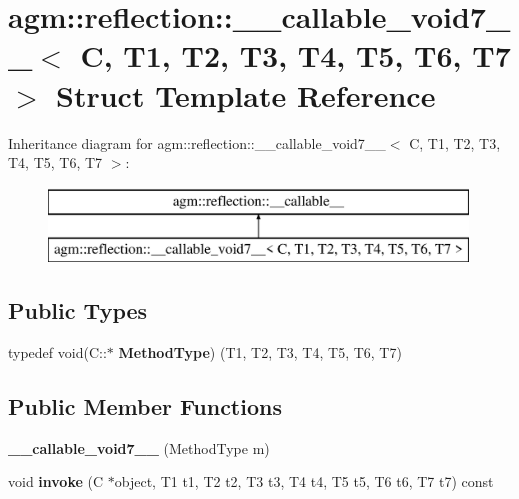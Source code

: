 \hypertarget{structagm_1_1reflection_1_1____callable__void7____}{}\section{agm\+:\+:reflection\+:\+:\+\_\+\+\_\+callable\+\_\+void7\+\_\+\+\_\+$<$ C, T1, T2, T3, T4, T5, T6, T7 $>$ Struct Template Reference}
\label{structagm_1_1reflection_1_1____callable__void7____}
Inheritance diagram for agm\+:\+:reflection\+:\+:\+\_\+\+\_\+callable\+\_\+void7\+\_\+\+\_\+$<$ C, T1, T2, T3, T4, T5, T6, T7 $>$\+:\begin{figure}[H]
\begin{center}
\leavevmode
\includegraphics[height=2.000000cm]{structagm_1_1reflection_1_1____callable__void7____}
\end{center}
\end{figure}
\subsection*{Public Types}
\begin{DoxyCompactItemize}
\item 
typedef void(C\+::$\ast$ {\bfseries Method\+Type}) (T1, T2, T3, T4, T5, T6, T7)\hypertarget{structagm_1_1reflection_1_1____callable__void7_____aed7c3feee9d1d9f0857a30996d0b3047}{}\label{structagm_1_1reflection_1_1____callable__void7_____aed7c3feee9d1d9f0857a30996d0b3047}

\end{DoxyCompactItemize}
\subsection*{Public Member Functions}
\begin{DoxyCompactItemize}
\item 
{\bfseries \+\_\+\+\_\+callable\+\_\+void7\+\_\+\+\_\+} (Method\+Type m)\hypertarget{structagm_1_1reflection_1_1____callable__void7_____a3556d546e733a480873f95bc6cbe8718}{}\label{structagm_1_1reflection_1_1____callable__void7_____a3556d546e733a480873f95bc6cbe8718}

\item 
void {\bfseries invoke} (C $\ast$object, T1 t1, T2 t2, T3 t3, T4 t4, T5 t5, T6 t6, T7 t7) const \hypertarget{structagm_1_1reflection_1_1____callable__void7_____a9dafd442b5d4c8acc0ad7fc65dd580ae}{}\label{structagm_1_1reflection_1_1____callable__void7_____a9dafd442b5d4c8acc0ad7fc65dd580ae}

\end{DoxyCompactItemize}
